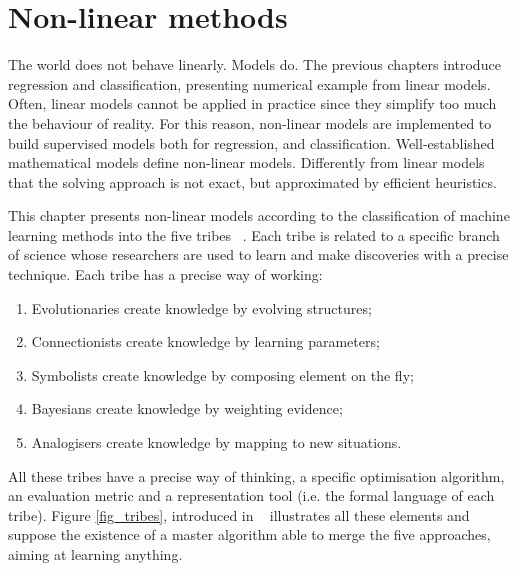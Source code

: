 \chapter{Non-linear methods}{The world does not behave linearly. Models do.} \label{cahpNonLinear}
The previous chapters introduce regression and classification, presenting numerical example from linear models. Often, linear models cannot be applied in practice since they simplify too much the behaviour of reality. For this reason, non-linear models are implemented to build supervised models both for regression, and classification. Well-established mathematical models define non-linear models. Differently from linear models that the solving approach is not exact, but approximated by efficient heuristics.\par

This chapter presents non-linear models according to the classification of machine learning methods into the five tribes ~\cite{Domingos2015}. Each tribe is related to a specific branch of science whose researchers are used to learn and make discoveries with a precise technique. Each tribe has a precise way of working:

\begin{enumerate}
    \item Evolutionaries create knowledge by evolving structures;
    \item Connectionists create knowledge by learning parameters;
    \item Symbolists create knowledge by composing element on the fly;
    \item Bayesians create knowledge by weighting evidence;
    \item Analogisers create knowledge by mapping to new situations.
\end{enumerate}

All these tribes have a precise way of thinking, a specific optimisation algorithm, an evaluation metric and a representation tool (i.e. the formal language of each tribe). Figure \ref{fig_tribes}, introduced in ~\cite{Domingos2015} illustrates all these elements and suppose the existence of a master algorithm able to merge the five approaches, aiming at learning anything.

